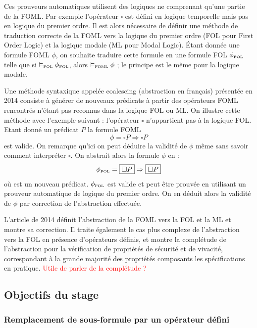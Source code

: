 \documentclass[12pt]{article}
\newcommand{\FOL}{\ensuremath{\textup{\tiny{}FOL}}}
\newcommand{\FOML}{\ensuremath{\textup{\tiny{}FOML}}}
\newcommand{\raph}[1]{\textcolor{red}{#1}}
\newcommand{\bpar}[1]{\marginpar{\color{myblue}\footnotesize\raggedright#1}}
\begin{document}
Ces prouveurs automatiques utilisent des logiques ne comprenant qu'une partie de la FOML.
Par exemple l'opérateur $\square$ est défini en logique temporelle mais pas en logique du premier ordre.
Il est alors nécessaire de définir une méthode de traduction correcte de la FOML vers la logique du premier ordre (FOL pour First Order Logic) et la logique modale (ML pour Modal Logic). %
Étant donnée une formule FOML $\phi$, on souhaite traduire cette formule en une formule FOL $\phi_\FOL$ telle que si $\vDash_\FOL \phi_\FOL$, alors $\vDash_\FOML \phi$ ; le principe est le même pour la logique modale.

Une méthode syntaxique appelée \og{}coalescing\fg{} (\og{}abstraction\fg{} en français) présentée en 2014 \cite{ARQNL2014} consiste à générer de nouveaux prédicats à partir des opérateurs FOML rencontrés n'étant pas reconnus dans la logique FOL ou ML.
On illustre cette méthode avec l'exemple suivant : l'opérateur $\square$ n'appartient pas à la logique FOL.
Etant donné un prédicat $P$ la formule FOML
\[ \phi = \square P \Rightarrow \square P \]
est valide.
On remarque qu'ici on peut déduire la validité de $\phi$ même sans savoir comment interpréter $\square$.
On abstrait alors la formule $\phi$ en :
\[ \phi_\FOL = \fbox{$\square P$} \Rightarrow \fbox{$\square P$} \]
où  est un nouveau prédicat.
$\phi_\FOL$ est valide et peut être prouvée en utilisant un prouveur automatique de logique du premier ordre.
On en déduit alors la validité de $\phi$ par correction de l'abstraction effectuée.

L'article de 2014 \cite{ARQNL2014} définit l'abstraction de la FOML vers la FOL et la ML et montre sa correction.
Il traite également le cas plus complexe de l'abstraction vers la FOL en présence d'opérateurs définis, et montre la complétude de l'abstraction pour la vérification de propriétés de sécurité et de vivacité, correspondant à la grande majorité des propriétés composants les spécifications en pratique. \raph{Utile de parler de la complétude ?}

\subsection{Objectifs du stage}

\subsubsection{Remplacement de sous-formule par un opérateur défini}
\end{document}
